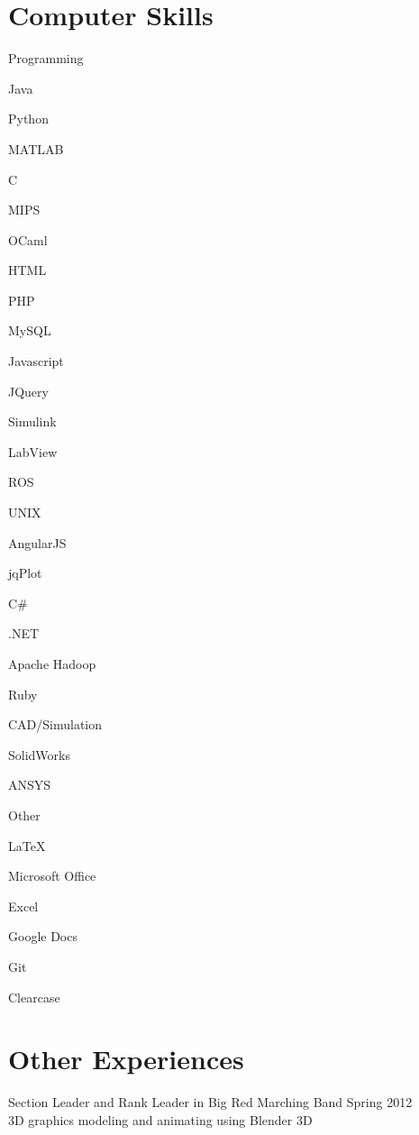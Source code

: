 \documentclass{BradyResume}
\begin{document}
\section*{Computer Skills}
\begin{delimlist}{Programming}
    \item Java
    \item Python
    \item MATLAB
    \item C
    \item MIPS
    \item OCaml
    \item HTML
    \item PHP
    \item MySQL
    \item Javascript
    \item JQuery
    \item Simulink 
    \item LabView
    \item ROS
    \item UNIX
    \item AngularJS
    \item jqPlot
    \item C\#
    \item .NET
    \item Apache Hadoop
    \item Ruby
\end{delimlist}

\begin{delimlist}{CAD/Simulation}
    \item SolidWorks
    \item ANSYS
\end{delimlist}

\begin{delimlist}{Other}
    \item \LaTeX\ 
    \item Microsoft Office%
    \item Excel
    \item Google Docs
    \item Git
    \item Clearcase
\end{delimlist}

\section*{Other Experiences}
Section Leader and Rank Leader in Big Red Marching Band \dotfill Spring 2012\\
3D graphics modeling and animating using Blender 3D
\end{document}
